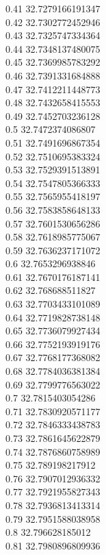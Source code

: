 {0.41	32.7279166191347\\
0.42	32.7302772452946\\
0.43	32.7325747334364\\
0.44	32.7348137480075\\
0.45	32.7369985783292\\
0.46	32.7391331684888\\
0.47	32.7412211448773\\
0.48	32.7432658415553\\
0.49	32.7452703236128\\
0.5	32.7472374086807\\
0.51	32.7491696867354\\
0.52	32.7510695383324\\
0.53	32.7529391513891\\
0.54	32.7547805366333\\
0.55	32.7565955418197\\
0.56	32.7583858648133\\
0.57	32.7601530656286\\
0.58	32.7618985775067\\
0.59	32.7636237171072\\
0.6	32.7653296938846\\
0.61	32.7670176187141\\
0.62	32.768688511827\\
0.63	32.7703433101089\\
0.64	32.7719828738148\\
0.65	32.7736079927434\\
0.66	32.7752193919176\\
0.67	32.7768177368082\\
0.68	32.7784036381384\\
0.69	32.7799776563022\\
0.7	32.7815403054286\\
0.71	32.7830920571177\\
0.72	32.7846333438783\\
0.73	32.7861645622879\\
0.74	32.7876860758989\\
0.75	32.789198217912\\
0.76	32.7907012936332\\
0.77	32.7921955827343\\
0.78	32.7936813413314\\
0.79	32.7951588038958\\
0.8	32.796628185012\\
0.81	32.7980896809936\\
}
